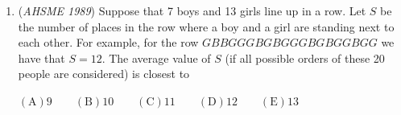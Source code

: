\begin{enumerate}
 (A) $-2^{50}$ (B) $-2^{49}$ (C) 0 (D) $2^{49}$ (E) $2^{50}$


	\item (\textit{AHSME 1989}) Suppose that 7 boys and 13 girls line up in a row. Let $S$ be the number of places in the row where a boy and a girl are standing next to each other. For example, for the row $GBBGGGBGBGGGBGBGGBGG$ we have that $S=12$. The average value of $S$ (if all possible orders of these 20 people are considered) is closest to


 $\mathrm{(A) 9 } \qquad \mathrm{(B) 10 } \qquad \mathrm{(C) 11 } \qquad \mathrm{(D) 12 } \qquad \mathrm{(E) 13 }$


\end{enumerate}
